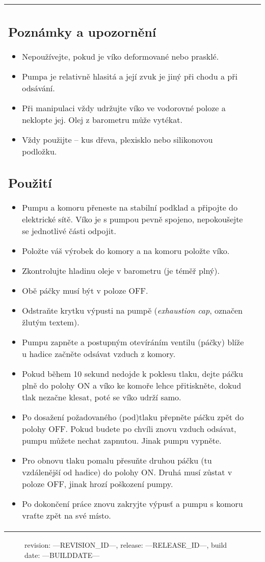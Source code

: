\documentclass[fleqn]{article}
\begin{document}
\begin{tabular}{@{}
                         p{}%
		         @{\hspace{.04\columnwidth}}%
		         p{}%
		         @{}%
}
\subsection{Poznámky a upozornění}
\begin{itemize}[noitemsep,topsep=0pt]
	\item Nepoužívejte, pokud je víko deformované nebo prasklé.
	\item Pumpa je relativně hlasitá a její zvuk je jiný při chodu \uv{na prázdno} a při odsávání.
	\item Při manipulaci vždy udržujte víko ve vodorovné poloze a neklopte jej. Olej z barometru může vytékat.
	\item Vždy použijte \uv{vlastní dno} -- kus dřeva, plexisklo nebo silikonovou podložku.
\end{itemize}

\subsection{Použití}
\begin{itemize}[noitemsep,topsep=0pt]
	\item Pumpu a komoru přeneste na stabilní podklad a připojte do elektrické sítě. Víko je s pumpou pevně spojeno, nepokoušejte se jednotlivé části odpojit.
	\item Položte váš výrobek do komory a na komoru položte víko.
	\item Zkontrolujte hladinu oleje v barometru (je téměř plný).
	\item Obě páčky musí být v poloze OFF.
	\item Odstraňte krytku výpusti na pumpě (\textit{exhaustion cap}, označen žlutým textem).
	\item Pumpu zapněte a postupným otevíráním ventilu (páčky) blíže u hadice začněte odsávat vzduch z komory.
	\item Pokud během 10 sekund nedojde k poklesu tlaku, dejte páčku plně do polohy ON a víko ke komoře lehce přitiskněte, dokud tlak nezačne klesat, poté se víko udrží samo.
	\item Po dosažení požadovaného (pod)tlaku přepněte páčku zpět do polohy OFF. Pokud budete po chvíli znovu vzduch odsávat, pumpu můžete nechat zapnutou. Jinak pumpu vypněte.
	\item Pro obnovu tlaku pomalu přesuňte druhou páčku (tu vzdálenější od hadice) do polohy ON. Druhá musí zůstat v poloze OFF, jinak hrozí poškození pumpy.
	\item Po dokončení práce znovu zakryjte výpusť a pumpu s komoru vraťte zpět na své místo.
\end{itemize}



\end{tabular}

\vfill

\begin{figure}[b]
	\flushright
	\begin{itshape}
    revision: ---REVISION\_ID---, release: ---RELEASE\_ID---, build date: ---BUILDDATE---
	\end{itshape}
\end{figure}
\end{document}

